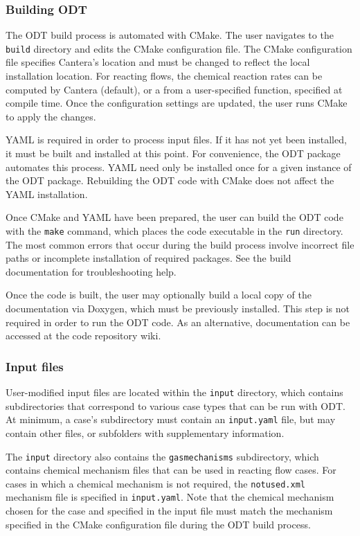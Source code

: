 \documentclass[preprint,12pt, a4paper]{elsarticle}
\begin{document}
\subsubsection{Building ODT}

The ODT build process is automated with CMake. The user navigates to the \texttt{build} directory and edits the CMake configuration file. The CMake configuration file specifies Cantera's location and must be changed to reflect the local installation location. For reacting flows, the chemical reaction rates can be computed by Cantera (default), or a from a user-specified function, specified at compile time. Once the configuration settings are updated, the user runs CMake to apply the changes. 

YAML is required in order to process input files. If it has not yet been installed, it must be built and installed at this point. For convenience, the ODT package automates this process. YAML need only be installed once for a given instance of the ODT package. Rebuilding the ODT code with CMake does not affect the YAML installation. 

Once CMake and YAML have been prepared, the user can build the ODT code with the \texttt{make} command, which places the code executable in the \texttt{run} directory. The most common errors that occur during the build process involve incorrect file paths or incomplete installation of required packages. See the build documentation for troubleshooting help. 

Once the code is built, the user may optionally build a local copy of the documentation via Doxygen, which must be previously installed. This step is not required in order to run the ODT code. As an alternative, documentation can be accessed at the code repository wiki. 

\subsubsection{Input files}

User-modified input files are located within the \texttt{input} directory, which contains subdirectories that correspond to various case types that can be run with ODT. At minimum, a case's subdirectory must contain an \texttt{input.yaml} file, but may contain other files, or subfolders with supplementary information. 

The \texttt{input} directory also contains the \texttt{gas\textunderscore mechanisms} subdirectory, which contains chemical mechanism files that can be used in reacting flow cases. For cases in which a chemical mechanism is not required, the \texttt{not\textunderscore used.xml} mechanism file is specified in \texttt{input.yaml}. Note that the chemical mechanism chosen for the case and specified in the input file must match the mechanism specified in the CMake configuration file during the ODT build process. 
\end{document}

